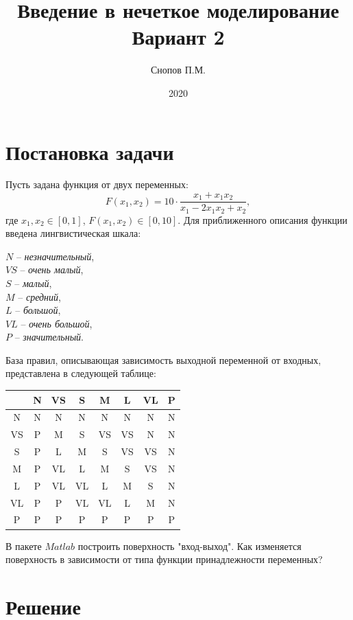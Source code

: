 \documentclass[11pt,a4paper]{report}
\title{Введение в нечеткое моделирование \protect \\ Вариант 2}
\author{Снопов П.М.}
\date{2020}
\begin{document}
	\maketitle
	\tableofcontents
	\newpage
	\section{Постановка задачи}
	Пусть задана функция от двух переменных:
	\[
		F(x_1,x_2) = 10 \cdot \frac{x_1 + x_1x_2}{x_1 - 2x_1x_2 + x_2},
	\]
	где $ x_1, x_2 \in [0,1] $, $ F(x_1,x_2) \in [0,10] $.
	\newline
	Для приближенного описания функции введена лингвистическая шкала:
	\begin{center}
		$N$ -- {\it незначительный}, \\
		$VS$ -- {\it очень малый}, \\
		$S$ -- {\it малый}, \\
		$M$ -- {\it средний}, \\
		$L$ -- {\it большой}, \\
		$VL$ -- {\it очень большой}, \\
		$P$ -- {\it значительный}.
	\end{center}
	База правил, описывающая зависимость выходной переменной от входных, представлена в следующей таблице:
	\begin{table}[!hbtp]
		\centering
		\begin{tabular}{|c|c|c|c|c|c|c|c|}
			\hline
			& N & VS & S  & M  & L  & VL & P \\ \hline
			N  & N & N  & N  & N  & N  & N  & N \\ \hline
			VS & P & M  & S  & VS & VS & N  & N \\ \hline
			S  & P & L  & M  & S  & VS & VS & N \\ \hline
			M  & P & VL & L  & M  & S  & VS & N \\ \hline
			L  & P & VL & VL & L  & M  & S  & N \\ \hline
			VL & P & P  & VL & VL & L  & M  & N \\ \hline
			P  & P & P  & P  & P  & P  & P  & P \\ \hline
		\end{tabular}
	\end{table}
	\newline
	В пакете $Matlab$ построить поверхность "вход-выход". Как изменяется поверхность в зависимости от типа функции принадлежности переменных?
	\newpage
	\section{Решение}
\end{document}
